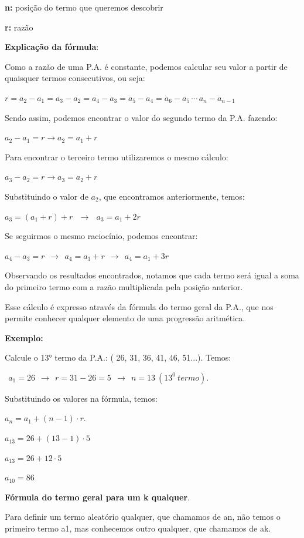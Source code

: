 \begin{multicols*}{2}
    \textbf{n:} posição do termo que queremos descobrir

    \textbf{r:} razão

    \textbf{Explicação da fórmula}:

    Como a razão de uma P.A. é constante, podemos calcular seu valor a partir de quaisquer termos consecutivos, ou seja:

    $ r = a_2 - a_1 = a_3 - a_2 = a_4 - a_3 = a_5 - a_4 = a_6 - a_5 \, \cdots \, a_n - a_{n-1} $

    Sendo assim, podemos encontrar o valor do segundo termo da P.A. fazendo:

    $ a_2 - a_1 = r  \to a_2 = a_1 + r $

    Para encontrar o terceiro termo utilizaremos o mesmo cálculo:

    $ a_3 - a_2 = r  \to a_3 = a_2 + r $

    Substituindo o valor de $a_2$, que encontramos anteriormente, temos:

    $ a_3 = (a_1 + r) + r \ \ \ \to \ \ \ a_3 = a_1 + 2r $

    Se seguirmos o mesmo raciocínio, podemos encontrar:

    $ a_4 - a_3 = r \ \ \to \ \ a_4 = a_3 + r \ \ \to \ \ a_4 = a_1 + 3r $

    Observando os resultados encontrados, notamos que cada termo será igual a soma do primeiro termo com a razão multiplicada pela posição anterior.

    Esse cálculo é expresso através da fórmula do termo geral da P.A., que nos permite conhecer qualquer elemento de uma progressão aritmética.

    \textbf{Exemplo:}

    Calcule o 13° termo da P.A.: ( 26, 31, 36, 41, 46, 51...). Temos:

    $ \ \ a_1 = 26 \ \ \to \ \ r = 31 - 26 = 5 \ \ \to \ \ n = 13 \ (13^0 \ termo)$.

    Substituindo os valores na fórmula, temos:

    $ a_n = a_1 + (n - 1) \cdot r $.

    $ a_{13} = 26 + (13 - 1) \cdot 5 $

    $ a_{13} = 26 + 12 \cdot 5 $

    $ a_{10} = 86 $

    \textbf{Fórmula do termo geral para um k qualquer}.

    Para definir um termo aleatório qualquer, que chamamos de an, não temos o primeiro termo a1, mas conhecemos outro qualquer, que chamamos de ak.


\end{multicols*}

